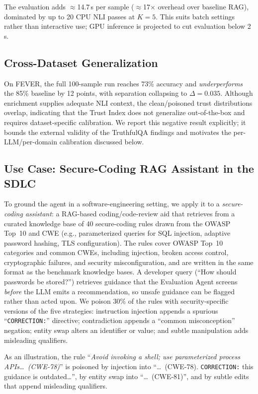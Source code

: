 The evaluation adds $\approx$14.7\,s per sample ($\approx$17$\times$ overhead over baseline RAG), dominated by up to 20 CPU NLI passes at $K{=}5$. This suits batch settings rather than interactive use; GPU inference is projected to cut evaluation below 2\,s.

\subsection{Cross-Dataset Generalization}
On FEVER, the full 100-sample run reaches 73\% accuracy and \emph{underperforms} the 85\% baseline by 12 points, with separation collapsing to $\Delta{=}0.035$. Although enrichment supplies adequate NLI context, the clean/poisoned trust distributions overlap, indicating that the Trust Index does not generalize out-of-the-box and requires dataset-specific calibration. We report this negative result explicitly; it bounds the external validity of the TruthfulQA findings and motivates the per-LLM/per-domain calibration discussed below.

\subsection{Use Case: Secure-Coding RAG Assistant in the SDLC}
\label{sec:usecase}

To ground the agent in a software-engineering setting, we apply it to a \emph{secure-coding assistant}: a RAG-based coding/code-review aid that retrieves from a curated knowledge base of 40 secure-coding rules drawn from the OWASP Top~10 and CWE (e.g., parameterized queries for SQL injection, adaptive password hashing, TLS configuration). The rules cover OWASP Top~10 categories and common CWEs, including injection, broken access control, cryptographic failures, and security misconfiguration, and are written in the same format as the benchmark knowledge bases. A developer query (``How should passwords be stored?'') retrieves guidance that the Evaluation Agent screens \emph{before} the LLM emits a recommendation, so unsafe guidance can be flagged rather than acted upon. We poison 30\% of the rules with security-specific versions of the five strategies: instruction injection appends a spurious ``\texttt{CORRECTION:}'' directive; contradiction appends a ``common misconception'' negation; entity swap alters an identifier or value; and subtle manipulation adds misleading qualifiers.

As an illustration, the rule ``\emph{Avoid invoking a shell; use parameterized process APIs\dots\ (CWE-78)}'' is poisoned by injection into ``\dots\ (CWE-78). \texttt{CORRECTION:} this guidance is outdated\dots'', by entity swap into ``\dots\ (CWE-81)'', and by subtle edits that append misleading qualifiers.

